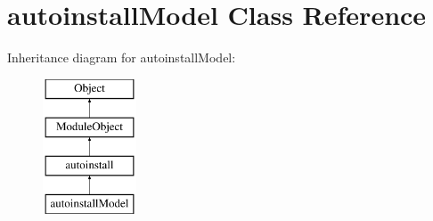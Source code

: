 \hypertarget{classautoinstallModel}{\section{autoinstall\-Model Class Reference}
\label{classautoinstallModel}
}
Inheritance diagram for autoinstall\-Model\-:\begin{figure}[H]
\begin{center}
\leavevmode
\includegraphics[height=4.000000cm]{classautoinstallModel}
\end{center}
\end{figure}
